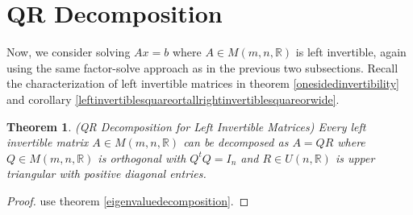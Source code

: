 \documentclass[12pt]{amsart}
\newtheorem{theorem}{Theorem}[section]
\theoremstyle{definition}
\begin{document}
\section{QR Decomposition} Now, we consider solving $Ax = b$ where $A \in M(m, n, \mathbb{R})$ is left invertible, again using the same factor-solve approach as in the previous two subsections. Recall the characterization of left invertible matrices in theorem \ref{onesidedinvertibility} and corollary \ref{leftinvertiblesquareortallrightinvertiblesquareorwide}.

\begin{theorem}\label{QRdecomposition} (QR Decomposition for Left Invertible Matrices) Every left invertible matrix $A \in M(m, n, \mathbb{R})$ can be decomposed as $A = QR$ where $Q \in M(m, n, \mathbb{R})$ is orthogonal with $Q^tQ = I_n$ and $R \in U(n, \mathbb{R})$ is upper triangular with positive diagonal entries.
\end{theorem}
\begin{proof} use theorem \ref{eigenvaluedecomposition}.
\end{proof}
\end{document}
